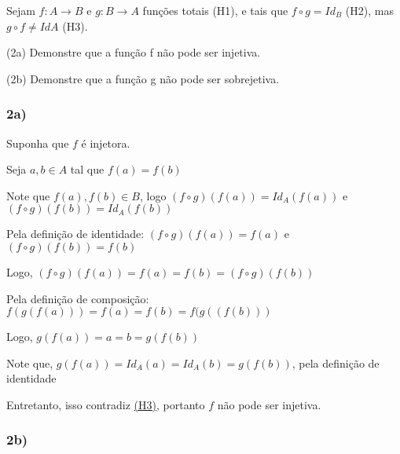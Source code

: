 Sejam 
$ f \colon A \to B $ e $ g \colon B \to A $ 
funções totais \hypertarget{h1}{(H1)}, e tais que 
$ f \circ g = Id_{B} $ 
\hypertarget{h2}{(H2)}, mas 
$ g \circ f \neq IdA $ \hypertarget{h3}{(H3)}.

(2a) Demonstre que a função f não pode ser injetiva.

(2b) Demonstre que a função g não pode ser sobrejetiva.

\begin{comment}
Como $ f \colon A \to B $ e $ g \colon B \to A $ e $ f \circ g = Id_{B} $ segue-se pelo \hyperlink{q2:lema1}{lema 1} que $ f $ é sobrejetiva e $ g $ é injetivas.
\end{comment}

\subsubsection*{2a)} 

Suponha que $ f $ é injetora. 

Seja $ a,b \in A $ tal que $ f(a) = f(b) $

Note que $ f(a), f(b) \in B $, logo $ (f \circ g)(f(a)) = Id_{A}(f(a)) $ e $ (f \circ g)(f(b)) = Id_{A}(f(b)) $

Pela definição de identidade: $ (f \circ g)(f(a)) = f(a) $ e $ (f \circ g)(f(b)) = f(b) $

Logo, $ (f \circ g)(f(a)) = f(a) = f(b) = (f \circ g)(f(b)) $

Pela definição de composição: $ f(g(f(a))) = f(a) = f(b) = f(g((f(b))) $

Logo,  $ g(f(a)) = a = b = g(f(b)) $

Note que, $ g(f(a)) = Id_{A}(a) = Id_{A}(b) = g(f(b)) $, pela definição de identidade

Entretanto, isso contradiz \hyperlink{h3}{(H3)}, portanto $ f $ não pode ser injetiva.

\subsubsection*{2b)}

 
